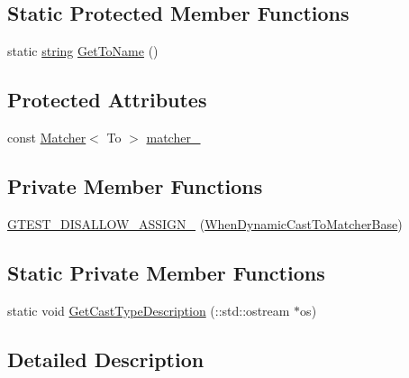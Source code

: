 \subsection*{Static Protected Member Functions}
\begin{DoxyCompactItemize}
\item 
static \hyperlink{namespacetesting_1_1internal_a8e8ff5b11e64078831112677156cb111}{string} \hyperlink{classtesting_1_1internal_1_1WhenDynamicCastToMatcherBase_a5950142a073ce7a1931848a958c88962}{Get\+To\+Name} ()
\end{DoxyCompactItemize}
\subsection*{Protected Attributes}
\begin{DoxyCompactItemize}
\item 
const \hyperlink{classtesting_1_1Matcher}{Matcher}$<$ To $>$ \hyperlink{classtesting_1_1internal_1_1WhenDynamicCastToMatcherBase_a40d697407c960bee8fe3b125f5ac8730}{matcher\+\_\+}
\end{DoxyCompactItemize}
\subsection*{Private Member Functions}
\begin{DoxyCompactItemize}
\item 
\hyperlink{classtesting_1_1internal_1_1WhenDynamicCastToMatcherBase_a49ba9167d6bb9e70abda113217018627}{G\+T\+E\+S\+T\+\_\+\+D\+I\+S\+A\+L\+L\+O\+W\+\_\+\+A\+S\+S\+I\+G\+N\+\_\+} (\hyperlink{classtesting_1_1internal_1_1WhenDynamicCastToMatcherBase}{When\+Dynamic\+Cast\+To\+Matcher\+Base})
\end{DoxyCompactItemize}
\subsection*{Static Private Member Functions}
\begin{DoxyCompactItemize}
\item 
static void \hyperlink{classtesting_1_1internal_1_1WhenDynamicCastToMatcherBase_ab3e9a533b6904da05dd7b96703689782}{Get\+Cast\+Type\+Description} (\+::std\+::ostream $\ast$os)
\end{DoxyCompactItemize}


\subsection{Detailed Description}
